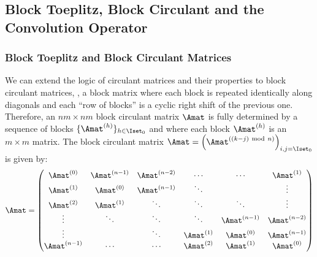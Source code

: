 \subsection{Block Toeplitz, Block Circulant and the Convolution Operator}
\label{subsection:ch2-block_toeplitz_and_block_circulant_matrices}

\subsubsection{Block Toeplitz and Block Circulant Matrices}
\label{subsubsection:ch2-block_circulant_and_block_toeplitz_matrices}

We can extend the logic of circulant matrices and their properties to block circulant matrices, \ie, a block matrix where each block is repeated identically along diagonals and each ``row of blocks'' is a cyclic right shift of the previous one.
Therefore, an $nm \times nm$ block circulant matrix $\Amat$ is fully determined by a sequence of blocks $\{\Amat^{(h)}\}_{h \in \Iset_0}$ and where each block $\Amat^{(h)}$ is an $m \times m$ matrix.
The block circulant matrix $\Amat = \leftmat \Amat^{((k-j) \mod n)} \rightmat_{i, j = \Iset_0} $ is given by:
\begin{equation}
  \Amat = 
  \leftmatrix
    \Amat^{(0)}   & \Amat^{(n-1)} & \Amat^{(n-2)} & \cdots      & \cdots        & \Amat^{(1)}   \\
    \Amat^{(1)}   & \Amat^{(0)}   & \Amat^{(n-1)} & \ddots      &               & \vdots        \\
    \Amat^{(2)}   & \Amat^{(1)}   & \ddots        & \ddots      & \ddots        & \vdots        \\ 
    \vdots        & \ddots        & \ddots        & \ddots      & \Amat^{(n-1)} & \Amat^{(n-2)} \\
    \vdots        &               & \ddots        & \Amat^{(1)} & \Amat^{(0)}   & \Amat^{(n-1)} \\
    \Amat^{(n-1)} & \cdots        & \cdots        & \Amat^{(2)} & \Amat^{(1)}   & \Amat^{(0)}
  \rightmatrix
\end{equation}

